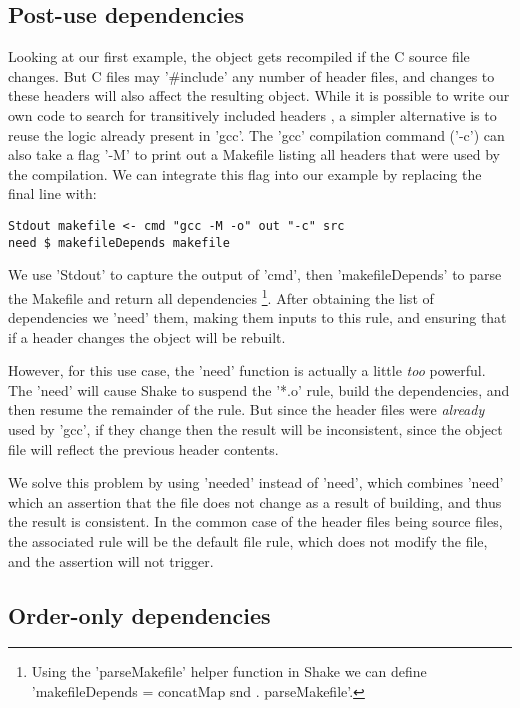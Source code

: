 \subsection{Post-use dependencies}

Looking at our first example, the object gets recompiled if the C source file changes. But C files may \lst'#include' any number of header files, and changes to these headers will also affect the resulting object. While it is possible to write our own code to search for transitively included headers \cite[\S6.4]{shake}, a simpler alternative is to reuse the logic already present in \lst'gcc'. The \lst'gcc' compilation command (\lst'-c') can also take a flag \lst'-M' to print out a Makefile listing all headers that were used by the compilation. We can integrate this flag into our example by replacing the final line with:

\begin{lstlisting}
Stdout makefile <- cmd "gcc -M -o" out "-c" src
need $ makefileDepends makefile
\end{lstlisting}

\noindent We use \lst'Stdout' to capture the output of \lst'cmd', then \lst'makefileDepends' to parse the Makefile and return all dependencies \footnote{Using the \lst'parseMakefile' helper function in Shake we can define \lst'makefileDepends = concatMap snd . parseMakefile'.}. After obtaining the list of dependencies we \lst'need' them, making them inputs to this rule, and ensuring that if a header changes the object will be rebuilt.

However, for this use case, the \lst'need' function is actually a little \emph{too} powerful. The \lst'need' will cause Shake to suspend the \lst'*.o' rule, build the dependencies, and then resume the remainder of the rule. But since the header files were \emph{already} used by \lst'gcc', if they change then the result will be inconsistent, since the object file will reflect the previous header contents.

We solve this problem by using \lst'needed' instead of \lst'need', which combines \lst'need' which an assertion that the file does not change as a result of building, and thus the result is consistent. In the common case of the header files being source files, the associated rule will be the default file rule, which does not modify the file, and the assertion will not trigger.

\subsection{Order-only dependencies}

